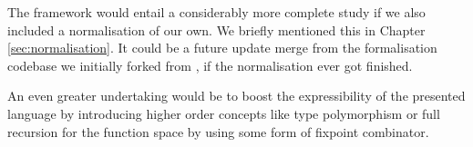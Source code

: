 The framework would entail a considerably more complete study if we also included a normalisation of our own. We briefly mentioned this in Chapter \ref{sec:normalisation}. It could be a future update merge from the formalisation codebase we initially forked from \cite{typesystems-repo}, if the normalisation ever got finished.

An even greater undertaking would be to boost the expressibility of the presented language by introducing higher order concepts like type polymorphism or full recursion for the function space by using some form of fixpoint combinator.

